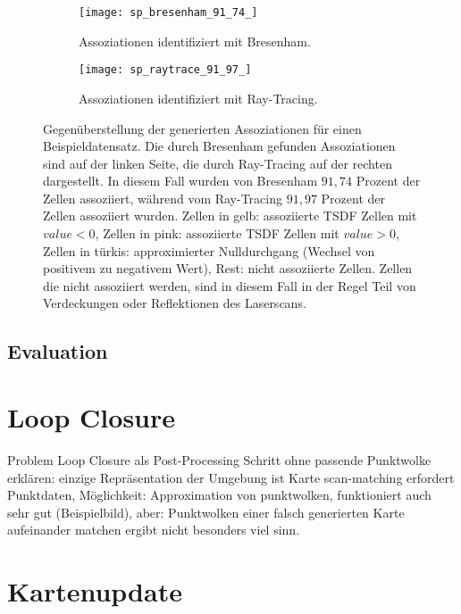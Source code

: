 \begin{figure}
	\centering
	\begin{subfigure}{.5\textwidth}
 		 \centering
  		 \texttt{[image: sp\_bresenham\_91\_74\_]}
  		 \centering \caption{Assoziationen identifiziert mit Bresenham.}
  		 \label{fig:sp_bresenham}
	\end{subfigure}%
	\begin{subfigure}{.5\textwidth}
    	\centering
  		\texttt{[image: sp\_raytrace\_91\_97\_]}
  		\centering \caption{Assoziationen identifiziert mit Ray-Tracing.}
  		\label{fig:sp_raytrace}
	\end{subfigure}
	\caption{Gegenüberstellung der generierten Assoziationen für einen Beispieldatensatz. Die durch Bresenham gefunden Assoziationen sind auf der linken Seite, die durch Ray-Tracing auf der rechten dargestellt. In diesem Fall wurden von Bresenham $91,74$ Prozent der Zellen assoziiert, während vom Ray-Tracing $91,97$ Prozent der Zellen assoziiert wurden. Zellen in gelb: assoziierte TSDF Zellen mit $value < 0$, Zellen in pink: assoziierte TSDF Zellen mit $value > 0$, Zellen in türkis: approximierter Nulldurchgang (Wechsel von positivem zu negativem Wert), Rest: nicht assoziierte Zellen. Zellen die nicht assoziiert werden, sind in diesem Fall in der Regel Teil von Verdeckungen oder Reflektionen des Laserscans.}
	\label{fig:bresenham_vs_raytrace}
\end{figure}

\subsection{Evaluation}
\label{section:association_evaluation}


\section{Loop Closure}

Problem Loop Closure als Post-Processing Schritt ohne passende Punktwolke erklären:
einzige Repräsentation der Umgebung ist Karte
scan-matching erfordert Punktdaten, Möglichkeit: Approximation von punktwolken, funktioniert auch sehr gut (Beispielbild), aber: Punktwolken einer falsch generierten Karte aufeinander matchen ergibt nicht besonders viel sinn.

\section{Kartenupdate}

